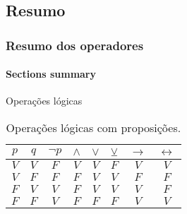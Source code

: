 \subsection{Resumo}
%
\begin{frame}[t]
    \frametitle{Resumo dos operadores}
    \framesubtitle{Sections summary}

    \begin{block}{Operações lógicas}
        \begin{table}[]
    \caption{Operações lógicas com proposições.}
    \label{tab:resumo}
    \begin{tabular}{|c|c|c|c|c|c|c|c|}
    \hline
    \rowcolor[HTML]{656565} 
    {\color[HTML]{FFFFFF} \textbf{$p$}} & {\color[HTML]{FFFFFF} \textbf{$q$}} & {\color[HTML]{FFFFFF} \textbf{$\lnot p$}} & {\color[HTML]{FFFFFF} \textbf{$\land$}} & {\color[HTML]{FFFFFF} \textbf{$\lor$}} & {\color[HTML]{FFFFFF} \textbf{$\veebar$}} & {\color[HTML]{FFFFFF} \textbf{$\rightarrow$}} & {\color[HTML]{FFFFFF} \textbf{$\leftrightarrow$}} \\ \hline
    $V$                               & $V$                               & $F$                                       & $V$                                     & $V$                                    & $F$                                       & $V$                                           & $V$                                               \\ \hline
    $V$                               & $F$                               & $F$                                       & $F$                                     & $V$                                    & $V$                                       & $F$                                           & $F$                                               \\ \hline
    $F$                               & $V$                               & $V$                                       & $F$                                     & $V$                                    & $V$                                       & $V$                                           & $F$                                               \\ \hline
    $F$                               & $F$                               & $V$                                       & $F$                                     & $F$                                    & $F$                                       & $V$                                           & $V$                                               \\ \hline
    \end{tabular}
    \end{table}
    \end{block}

\end{frame}